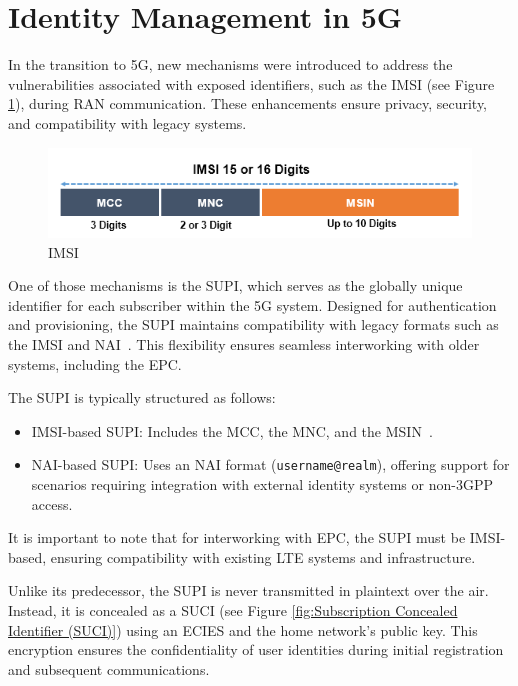 \section{Identity Management in \acs{5G}}

In the transition to \ac{5G}, new mechanisms were introduced to address the vulnerabilities associated with exposed identifiers, such as the \ac{IMSI} (see Figure \ref{fig:International Mobile Subscriber Identity (IMSI)}), during \ac{RAN} communication. These enhancements ensure privacy, security, and compatibility with legacy systems.

\begin{figure}
    \centering
    \includegraphics[width=0.75\linewidth]{figs/International Mobile Subscriber Identity (IMSI).png}
    \caption{\ac{IMSI}}
    \label{fig:International Mobile Subscriber Identity (IMSI)}
\end{figure}

One of those mechanisms is the \ac{SUPI}, which serves as the globally unique identifier for each subscriber within the \ac{5G} system. Designed for authentication and provisioning, the \ac{SUPI} maintains compatibility with legacy formats such as the \ac{IMSI} and \ac{NAI}~\cite{23.501-p243}. This flexibility ensures seamless interworking with older systems, including the \ac{EPC}.

The \ac{SUPI} is typically structured as follows:
\begin{itemize}
    \item {
        \ac{IMSI}-based \ac{SUPI}: Includes the \ac{MCC}, the \ac{MNC}, and the \ac{MSIN}~\cite{23.003-p20}.
    }
    \item {
        \ac{NAI}-based \ac{SUPI}: Uses an \ac{NAI} format (\texttt{username@realm}), offering support for scenarios requiring integration with external identity systems or non-\ac{3GPP} access.
    }
\end{itemize}

It is important to note that for interworking with \ac{EPC}, the \ac{SUPI} must be \ac{IMSI}-based, ensuring compatibility with existing \ac{LTE} systems and infrastructure.

Unlike its predecessor, the \ac{SUPI} is never transmitted in plaintext over the air. Instead, it is concealed as a \ac{SUCI} (see Figure \ref{fig:Subscription Concealed Identifier (SUCI)}) using an \ac{ECIES} and the home network’s public key. This encryption ensures the confidentiality of user identities during initial registration and subsequent communications.

